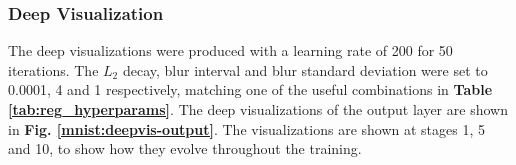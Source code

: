 \subsubsection{Deep Visualization}

The deep visualizations were produced with a learning rate of 200 for 50 iterations. The $L_2$ decay, blur interval and blur standard deviation were set to 0.0001, 4 and 1 respectively, matching one of the useful combinations in \textbf{Table \ref{tab:reg_hyperparams}}. The deep visualizations of the output layer are shown in \textbf{Fig. \ref{mnist:deepvis-output}}. The visualizations are shown at stages 1, 5 and 10, to show how they evolve throughout the training.

